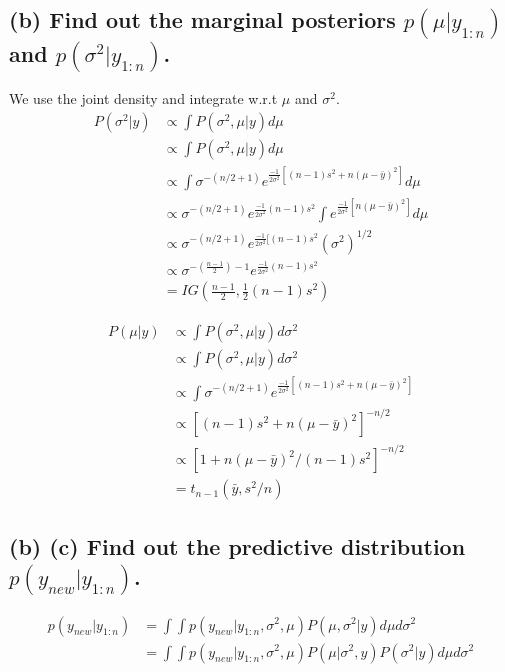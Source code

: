 \documentclass[11pt]{article}
\begin{document}
\subsection*{(b) Find out the marginal posteriors $p(\mu |y_{1:n})$ and $p(\sigma^2 |y_{1:n})$.}

We use the joint density and integrate w.r.t $\mu$ and $\sigma^2$.
\begin{align*}
    P(\sigma^2|y) &\propto \int P(\sigma^2, \mu|y)d\mu \\
    &\propto \int P(\sigma^2, \mu|y)d\mu \\
    &\propto \int \sigma^{-(n/2 + 1)}e^{\frac{-1}{2\sigma^2}[(n-1)s^2+n(\mu-\bar{y})^2]}d\mu \\
    &\propto \sigma^{-(n/2 + 1)}e^{\frac{-1}{2\sigma^2}(n-1)s^2} \int e^{\frac{-1}{2\sigma^2}[n(\mu-\bar{y})^2]}d\mu \\
     &\propto \sigma^{-(n/2 + 1)}e^{\frac{-1}{2\sigma^2}[(n-1)s^2} (\sigma^2)^{1/2} \\
     &\propto \sigma^{-\left(\frac{n-1}{2}\right)- 1}e^{\frac{-1}{2\sigma^2}(n-1)s^2}\\
     &= IG\left( \frac{n-1}{2}, \frac{1}{2}(n-1)s^2\right)
\end{align*}


\begin{align*}
    P(\mu|y) &\propto \int P(\sigma^2, \mu|y)d\sigma^2 \\
    &\propto \int P(\sigma^2, \mu|y)d\sigma^2 \\
    &\propto \int \sigma^{-(n/2 + 1)}e^{\frac{-1}{2\sigma^2}[(n-1)s^2+n(\mu-\bar{y})^2]}\\
    &\propto [(n-1)s^2+n(\mu-\bar{y})^2]^{-n/2}\\
    &\propto [1+n(\mu-\bar{y})^2/(n-1)s^2]^{-n/2}\\
    &= t_{n-1}(\bar{y}, s^2/n)
\end{align*}


\subsection*{(b) (c) Find out the predictive distribution $p(y_{new} |y_{1:n})$.}

\begin{align*}
    p(y_{new} |y_{1:n}) &= \int \int p(y_{new} |y_{1:n}, \sigma^2, \mu)P(\mu, \sigma^2|y)d\mu d\sigma^2\\
     &= \int \int p(y_{new} |y_{1:n}, \sigma^2, \mu)P(\mu| \sigma^2,y)P(\sigma^2|y)d\mu d\sigma^2\\
\end{align*}
\end{document}
